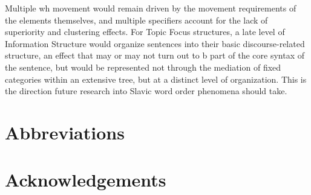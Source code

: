 \documentclass[output=paper]{langscibook}
\begin{document}
Multiple wh movement would remain driven by the movement requirements of the elements themselves, and multiple specifiers account for the lack of superiority and clustering effects.  For Topic Focus structures, a late level of Information Structure would organize sentences into their basic discourse-related structure, an effect that may or may not turn out to b part of the core syntax of the sentence, but would be represented not through the mediation of fixed categories within an extensive tree, but at a distinct level of organization. This is the direction future research into Slavic word order phenomena should take. 



\section*{Abbreviations}
% 
% 
\section*{Acknowledgements}

\printbibliography[heading=subbibliography,notkeyword=this]
\end{document}
